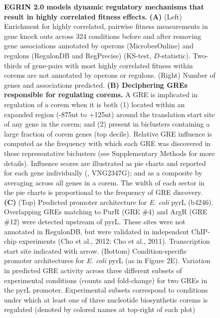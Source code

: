 \begin{figure}[!b]
\centering
{}
\caption{{\bf EGRIN 2.0 models dynamic regulatory mechanisms that
    result in highly correlated fitness effects.}  
{\bf (A)} (Left) Enrichment for highly correlated, pairwise fitness
  measurements in gene knock outs across 324 conditions before and
  after removing gene associations annotated by operons
  (MicrobesOnline) and regulons (RegulonDB and RegPrecise) (KS-test,
  $D$-statistic). Two-thirds of gene-pairs with most highly correlated
  fitness within corems are not annotated by operons or
  regulons. (Right) Number of genes and associations predicted. {\bf (B)
  Deciphering GREs responsible for regulating corems.} A GRE is
  implicated in regulation of a corem when it is both (1) located
  within an expanded region (-875nt to +125nt) around the translation
  start site of any gene in the corem; and (2) present in biclusters
  containing a large fraction of corem genes (top decile). Relative
  GRE influence is computed as the frequency with which each GRE was
  discovered in these representative biclusters (see Supplementary
  Methods for more details). Influence scores are illustrated as pie
  charts and reported for each gene individually (\eg, VNG2347G); and
  as a composite by averaging across all genes in a corem. The width
  of each sector in the pie charts is proportional to the frequency of
  GRE discovery.  {\bf (C)} (Top) Predicted promoter architecture for
  {\it E. coli} pyrL (b4246). Overlapping GREs matching to PurR (GRE \#4) and
  ArgR (GRE \#12) were detected upstream of pyrL. These sites were not
  annotated in RegulonDB, but were validated in independent ChIP-chip
  experiments (Cho et al., 2012; Cho et al., 2011). Transcription
  start site indicated with arrow. (Bottom) Condition-specific
  promoter architectures for {\it E. coli} pyrL (as in Figure 2E). Variation
  in predicted GRE activity across three different subsets of
  experimental conditions (counts and fold-change) for two GREs in the
  pyrL promoter. Experimental subsets correspond to conditions under
  which at least one of three nucleotide biosynthetic corems is
  regulated (denoted by colored names at top-right of each plot) }
\label{fig:fitness}
\vspace{-.1in}
\end{figure}

